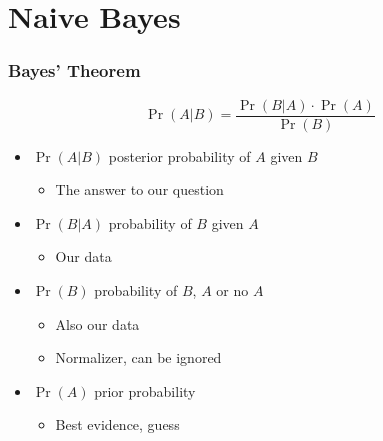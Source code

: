 \documentclass[mathserif, xcolor=table, svgnames]{beamer}
\begin{document}
\section[IBL]{Naive Bayes}
\frame{\tableofcontents[currentsection]}

{

}

\begin{frame}
  \frametitle{Bayes' Theorem}
  \begin{equation*}
    \Pr(A|B) = 
    \frac{\Pr(B|A) \cdot \Pr(A)}{\Pr(B)}
  \end{equation*}
  \begin{itemize}
  \item $\Pr(A|B)$ posterior probability of $A$ given $B$
    \begin{itemize}
    \item The answer to our question
    \end{itemize}
  \item $\Pr(B|A)$ probability of $B$ given $A$
    \begin{itemize}
    \item Our data
    \end{itemize}
  \item $\Pr(B)$ probability of $B$, $A$ or no $A$
    \begin{itemize}
    \item Also our data
    \item Normalizer, can be ignored
    \end{itemize}
  \item $\Pr(A)$ prior probability
    \begin{itemize}
    \item Best evidence, guess
    \end{itemize}
  \end{itemize}
\end{frame}

{

}

{

}
\end{document}
